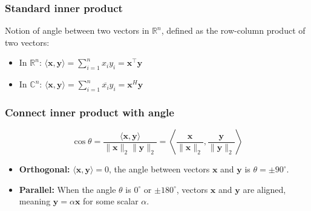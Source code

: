 \subsubsection{Standard inner product}
\begin{definition}
    Notion of angle between two vectors in $\mathbb{R}^n$, defined as the row-column product of two vectors:
    \begin{itemize}
        \item In \( \mathbb{R}^n \): $\langle \mathbf{x}, \mathbf{y} \rangle = \sum_{i=1}^{n} x_i y_i = \mathbf{x}^\top \mathbf{y}$
        \item In \( \mathbb{C}^n \): $\langle \mathbf{x}, \mathbf{y} \rangle = \sum_{i=1}^{n} \overline{x_i} y_i = \mathbf{x}^H \mathbf{y}$
    \end{itemize}
\end{definition}

\subsubsection{Connect inner product with angle}
    \begin{definition}
        \begin{equation}
            \cos\theta = \frac{\langle \mathbf{x}, \mathbf{y} \rangle}{\|\mathbf{x}\|_2 \|\mathbf{y}\|_2} = \left\langle \frac{\mathbf{x}}{\|\mathbf{x}\|_2}, \frac{\mathbf{y}}{\|\mathbf{y}\|_2} \right\rangle
        \end{equation}
        \begin{itemize}
            \item \textbf{Orthogonal:} \( \langle \mathbf{x}, \mathbf{y} \rangle = 0 \), the angle between vectors \( \mathbf{x} \) and \( \mathbf{y} \) is \( \theta = \pm 90^\circ \).
            \item \textbf{Parallel:} When the angle \( \theta \) is \( 0^\circ \) or \( \pm 180^\circ \), vectors \( \mathbf{x} \) and \( \mathbf{y} \) are aligned, meaning \( \mathbf{y} = \alpha \mathbf{x} \) for some scalar \( \alpha \).
        \end{itemize}
    \end{definition}

